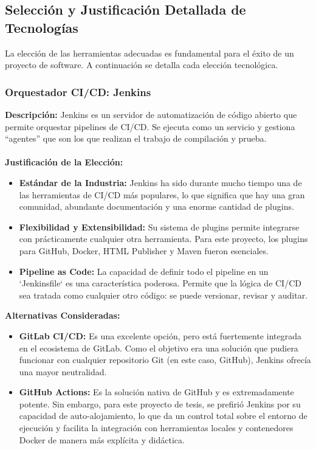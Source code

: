 \subsection{Selección y Justificación Detallada de Tecnologías}

La elección de las herramientas adecuadas es fundamental para el éxito de un proyecto de software. A continuación se detalla cada elección tecnológica.

\subsubsection{Orquestador CI/CD: Jenkins}
\textbf{Descripción:} Jenkins es un servidor de automatización de código abierto que permite orquestar pipelines de CI/CD. Se ejecuta como un servicio y gestiona ``agentes'' que son los que realizan el trabajo de compilación y prueba.
\\
\\
\textbf{Justificación de la Elección:}
\begin{itemize}
    \item \textbf{Estándar de la Industria:} Jenkins ha sido durante mucho tiempo una de las herramientas de CI/CD más populares, lo que significa que hay una gran comunidad, abundante documentación y una enorme cantidad de plugins.
    \item \textbf{Flexibilidad y Extensibilidad:} Su sistema de plugins permite integrarse con prácticamente cualquier otra herramienta. Para este proyecto, los plugins para GitHub, Docker, HTML Publisher y Maven fueron esenciales.
    \item \textbf{Pipeline as Code:} La capacidad de definir todo el pipeline en un `Jenkinsfile` es una característica poderosa. Permite que la lógica de CI/CD sea tratada como cualquier otro código: se puede versionar, revisar y auditar.
\end{itemize}
\textbf{Alternativas Consideradas:}
\begin{itemize}
    \item \textbf{GitLab CI/CD:} Es una excelente opción, pero está fuertemente integrada en el ecosistema de GitLab. Como el objetivo era una solución que pudiera funcionar con cualquier repositorio Git (en este caso, GitHub), Jenkins ofrecía una mayor neutralidad.
    \item \textbf{GitHub Actions:} Es la solución nativa de GitHub y es extremadamente potente. Sin embargo, para este proyecto de tesis, se prefirió Jenkins por su capacidad de auto-alojamiento, lo que da un control total sobre el entorno de ejecución y facilita la integración con herramientas locales y contenedores Docker de manera más explícita y didáctica.
\end{itemize}

